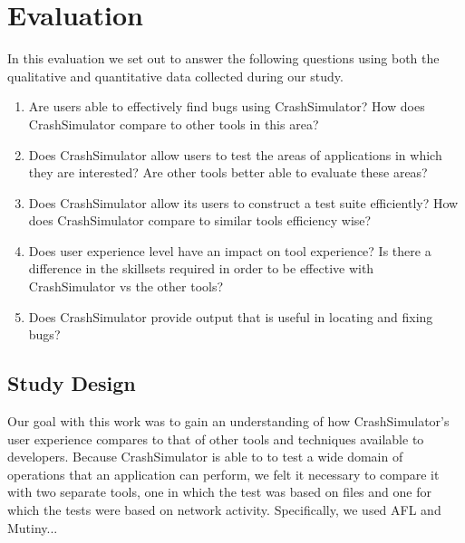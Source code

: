 \section{Evaluation}
\label{SEC:evaluation}

In this evaluation we set out to answer the following questions using both
the qualitative and quantitative data collected during our study.

\begin{enumerate}

\item Are users able to effectively find bugs using CrashSimulator?  How
does CrashSimulator compare to other tools in this area?

\item Does CrashSimulator allow users to test the areas of
applications in which they are interested?  Are other tools better able to
evaluate these areas?

\item Does CrashSimulator allow its users to construct a test suite
efficiently?  How does CrashSimulator compare to similar tools
efficiency wise?

\item Does user experience level have an impact on tool experience?  Is
there a difference in the skillsets required in order to be effective
with CrashSimulator vs the other tools?

\item Does CrashSimulator provide output that is useful in locating and
fixing bugs?

\end{enumerate}

\subsection{Study Design}



Our goal with this work was to gain an understanding of
how CrashSimulator's
user experience compares to that of other tools and techniques available to
developers.  Because CrashSimulator is able to to test a wide domain
of operations that an
application can perform, we felt it necessary to compare
it with two separate
tools, one in which the test was based on files and one for which the tests
were based on network
activity.  Specifically, we used AFL and Mutiny...


